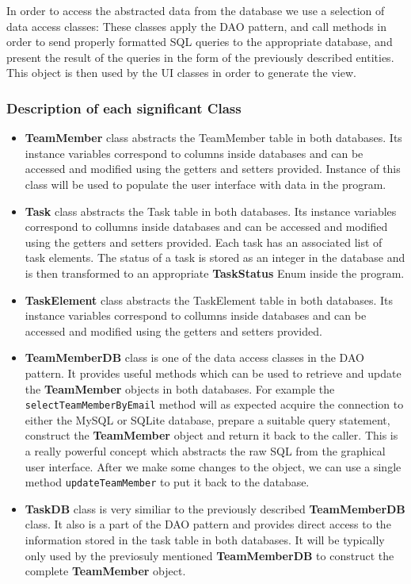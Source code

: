   In order to access the abstracted data from the database we use a selection of data access classes:
  These classes apply the DAO pattern, and call methods in order to send properly formatted SQL queries to the appropriate database, and present the result of the queries in the form of the previously described entities. 
  This object is then used by the UI classes in order to generate the view.

  \subsubsection{Description of each significant Class}

  \begin{itemize}
  		\item \textbf{TeamMember} class abstracts the TeamMember table in both databases. Its instance variables correspond to columns inside 
  		databases and can be accessed and modified using the getters and setters provided. Instance of this class will be used to populate
  		the user interface with data in the program.
  		\item \textbf{Task} class abstracts the Task table in both databases. Its instance variables correspond to collumns inside 
  		databases and can be accessed and modified using the getters and setters provided. Each task has an associated list of task elements. The status of a task is stored as an integer in the database and is then transformed to an appropriate \textbf{TaskStatus} Enum inside the program.
  		\item \textbf{TaskElement} class abstracts the TaskElement table in both databases. Its instance variables correspond to collumns inside 
  		databases and can be accessed and modified using the getters and setters provided. 
  		\item \textbf{TeamMemberDB} class is one of the data access classes in the DAO pattern. It provides useful methods which can be used to retrieve and update the \textbf{TeamMember} objects in both databases. For example the \texttt{selectTeamMemberByEmail} method will as expected acquire the connection to either the MySQL or SQLite database, prepare a suitable query statement, construct the \textbf{TeamMember}
  		object and return it back to the caller. This is a really powerful concept which abstracts the raw SQL from the graphical user interface. After we make some changes to the object, we can use a single method \texttt{updateTeamMember} to put it back to the database. 
  		\item \textbf{TaskDB} class is very similiar to the previously described \textbf{TeamMemberDB} class. It also is a part of the DAO pattern and provides direct access to the information stored in the task table in both databases. It will be typically only used by the previosuly mentioned \textbf{TeamMemberDB} to construct the complete \textbf{TeamMember} object.

\end{itemize}
